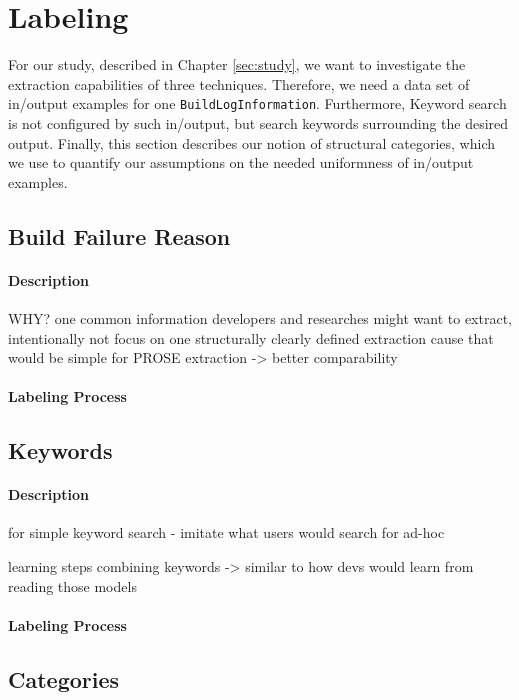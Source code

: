 \documentclass[\myrootdir/main.tex]{subfiles}
\begin{document}
\section{Labeling}
For our study, described in Chapter \ref{sec:study}, we want to investigate the extraction capabilities of three techniques. Therefore, we need a data set of in/output examples for one \texttt{BuildLogInformation}. Furthermore, Keyword search is not configured by such in/output, but search keywords surrounding the desired output. Finally, this section describes our notion of structural categories, which we use to quantify our assumptions on the needed uniformness of in/output examples.

  \subsection{Build Failure Reason}

    \paragraph{Description}
    WHY? one common information developers and researches might want to extract, intentionally not focus on one structurally clearly defined extraction   cause that would be simple for PROSE extraction -> better comparability
    \paragraph{Labeling Process}

  \subsection{Keywords}

    \paragraph{Description}
    for simple keyword search - imitate what users would search for ad-hoc

    learning steps combining keywords -> similar to how devs would learn from reading those models

    \paragraph{Labeling Process}

  \subsection{Categories}
\end{document}
